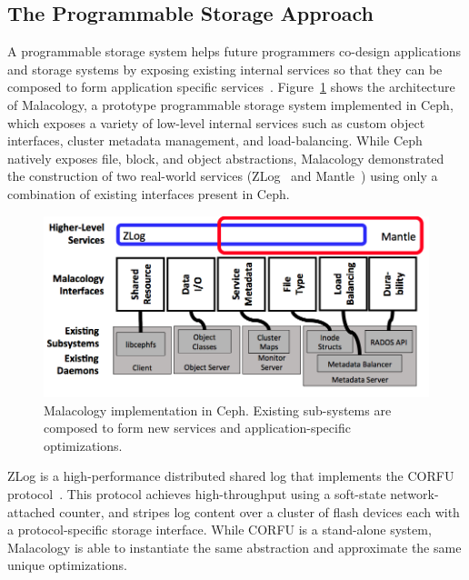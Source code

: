 \subsection{The Programmable Storage Approach}


A programmable storage system helps future programmers co-design applications
and storage systems by exposing existing internal services so that 
they can be composed to form application specific
services~\cite{sevilla:eurosys17}.
Figure~\ref{fig:malacology} shows the architecture of Malacology, a prototype programmable storage system
implemented in Ceph, which exposes a variety of low-level internal services
such as custom object interfaces, cluster metadata management, and
load-balancing. While Ceph natively exposes file, block, and object
abstractions, Malacology demonstrated the construction of two real-world
services (ZLog~\cite{watkins:ucsc-soe-16-12} and Mantle~\cite{sevilla:sc15-mantle}) using only a combination of existing interfaces present in Ceph.

\begin{figure}[t]
\centering
\includegraphics[width=1.0\linewidth]{implementation-overview.png}
\caption{Malacology implementation in Ceph. Existing sub-systems are composed
    to form new services and application-specific optimizations.}
\label{fig:malacology}
\end{figure}

ZLog is a high-performance distributed shared
log that implements the CORFU protocol~\cite{balakrishnan:nsdi12}.
This protocol achieves high-throughput using a soft-state network-attached
counter, and stripes log content over a cluster of flash devices each with a
protocol-specific storage interface. While CORFU is a stand-alone system,
Malacology is able to instantiate the same abstraction and approximate 
the same unique optimizations.

